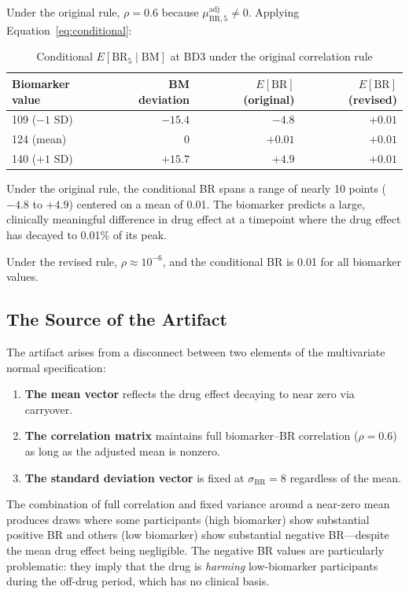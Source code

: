 \documentclass[11pt]{article}
\begin{document}
Under the original rule, $\rho = 0.6$ because
$\mu_{\text{BR},5}^{\text{adj}} \neq 0$. Applying
Equation~\ref{eq:conditional}:

\begin{table}[h]
\centering
\caption{Conditional $E[\text{BR}_5 \mid \text{BM}]$ at
  BD3 under the original correlation rule}
\begin{tabular}{lrrr}
\toprule
Biomarker value & BM deviation & $E[\text{BR}]$
  (original) & $E[\text{BR}]$ (revised) \\
\midrule
109 ($-1$ SD) & $-15.4$ & $-4.8$ & $+0.01$ \\
124 (mean) & $0$ & $+0.01$ & $+0.01$ \\
140 ($+1$ SD) & $+15.7$ & $+4.9$ & $+0.01$ \\
\bottomrule
\end{tabular}
\label{tab:conditional}
\end{table}

Under the original rule, the conditional BR spans a range of
nearly 10 points ($-4.8$ to $+4.9$) centered on a mean of
0.01. The biomarker predicts a large, clinically meaningful
difference in drug effect at a timepoint where the drug effect
has decayed to 0.01\% of its peak.

Under the revised rule, $\rho \approx 10^{-6}$, and the
conditional BR is 0.01 for all biomarker values.

\subsection{The Source of the Artifact}

The artifact arises from a disconnect between two elements of
the multivariate normal specification:

\begin{enumerate}
\item \textbf{The mean vector} reflects the drug effect
  decaying to near zero via carryover.
\item \textbf{The correlation matrix} maintains full
  biomarker--BR correlation ($\rho = 0.6$) as long as the
  adjusted mean is nonzero.
\item \textbf{The standard deviation vector} is fixed at
  $\sigma_{\text{BR}} = 8$ regardless of the mean.
\end{enumerate}

The combination of full correlation and fixed variance around
a near-zero mean produces draws where some participants (high
biomarker) show substantial positive BR and others (low
biomarker) show substantial negative BR---despite the mean
drug effect being negligible. The negative BR values are
particularly problematic: they imply that the drug is
\emph{harming} low-biomarker participants during the off-drug
period, which has no clinical basis.
\end{document}
